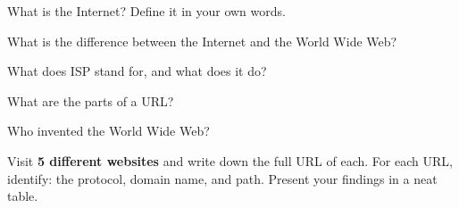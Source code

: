 \begin{reviewqs}
  \item What is the Internet? Define it in your own words.
  \item What is the difference between the Internet and the World Wide Web?
  \item What does ISP stand for, and what does it do?
  \item What are the parts of a URL?
  \item Who invented the World Wide Web?
\end{reviewqs}

\begin{challenge}
Visit \textbf{5 different websites} and write down the full URL of each. For each URL, identify: the protocol, domain name, and path. Present your findings in a neat table.
\end{challenge}
